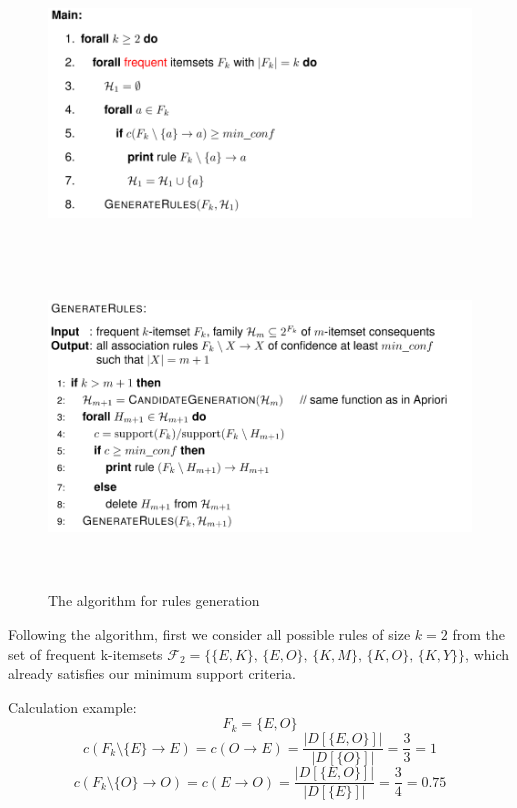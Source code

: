 \documentclass{article}
\begin{document}
  \begin{figure}[H]
    \centering
    \includegraphics[width=15cm, height=7.5cm]{Rule generation 1.png}
    \includegraphics[width=15cm, height=8.3cm]{Rule generation 2.png}
    \caption{The algorithm for rules generation}
    \label{fig:enter-label}
  \end{figure}

  Following the algorithm, first we consider all possible rules of size $k=2$ from the set of frequent k-itemsets $\mathcal{F}_2 = \{\{E,K\},\, \{E,O\},\, \{K,M\},\, \{K,O\},\, \{K,Y\}\}$, which already satisfies our minimum support criteria.

  Calculation example:
  $${F}_k = \{E, O\}$$
  $$c({F}_k \setminus \{E\} \to E) = c(O \to E) = \dfrac{|D[\{E, O\}]|}{|D[\{O\}]|} = \dfrac{3}{3} = 1$$
  $$c({F}_k \setminus \{O\} \to O) = c(E \to O) = \dfrac{|D[\{E, O\}]|}{|D[\{E\}]|} = \dfrac{3}{4} = 0.75$$
\end{document}
